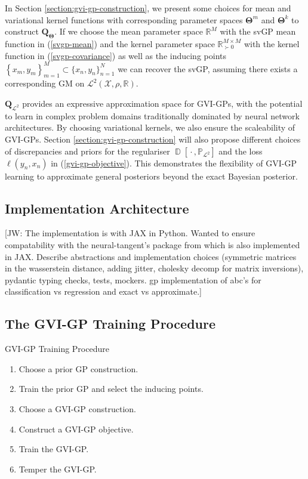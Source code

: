 \documentclass{article}
\newcommand{\jw}[1]{{\color{gray} [JW: #1]}}
\newcommand{\D}{\operatorname{\mathbb{D}}}
\newcommand{\wc}{\operatorname{{}\cdot{}}}
\numberwithin{equation}{section}
\begin{document}
In Section \ref{section:gvi-gp-construction}, we present some choices for mean and variational kernel functions with corresponding parameter spaces $\boldsymbol{\Theta}^m$ and $\boldsymbol{\Theta}^k$ to construct $\boldsymbol{Q}_{\boldsymbol{\Theta}}$. 
If we choose the mean parameter space $\mathbb{R}^M$ with the svGP mean function in (\ref{svgp-mean}) and the kernel parameter space $\mathbb{R}^{M\times M}_{\succ 0}$ with the kernel function in (\ref{svgp-covariance}) as well as the inducing points $\left\{x_m, y_m\right\}_{m=1}^{M} \subset \{x_n, y_n\}_{n=1}^{N}$ we can recover the svGP, assuming there exists a corresponding GM on $\mathcal{L}^2(\mathcal{X}, \rho, \mathbb{R})$. 

$\boldsymbol{Q}_{\mathcal{L}^2}$ provides an expressive approximation space for GVI-GPs, with the potential to learn in complex problem domains traditionally dominated by neural network architectures.
By choosing variational kernels, we also ensure the scaleability of GVI-GPs. 
Section \ref{section:gvi-gp-construction} will also propose different choices of discrepancies and priors for the regulariser $\D\left[\wc, \mathbb{P}_{\mathcal{L}^2}\right]$ and the loss $\ell(y_n, x_n)$ in (\ref{gvi-gp-objective}). This demonstrates the flexibility of GVI-GP learning to approximate general posteriors beyond the exact Bayesian posterior.

\subsection{Implementation Architecture}

\jw{The implementation is with JAX in Python. Wanted to ensure compatability with the neural-tangent's package from \cite{novak2019neural} which is also implemented in JAX. Describe abstractions and implementation choices (symmetric matrices in the wasserstein distance, adding jitter, cholesky decomp for matrix inversions), pydantic typing checks, tests, mockers. gp implementation of abc's for classification vs regression and exact vs approximate.}

\subsection{The GVI-GP Training Procedure}

\begin{algorithm}
\caption{GVI-GP Training Procedure}\label{alg:gvi-gp}
\begin{algorithmic}
\begin{enumerate}
    \item Choose a prior GP construction.
    \item Train the prior GP and select the inducing points.
    \item Choose a GVI-GP construction.
    \item Construct a GVI-GP objective.
    \item Train the GVI-GP.
    \item Temper the GVI-GP.
\end{enumerate}
\end{algorithmic}
\end{algorithm}
\end{document}
